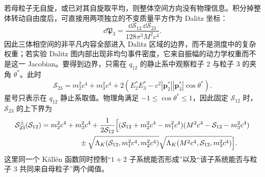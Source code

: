 若母粒子无自旋，或已对其自旋取平均，则整体空间方向没有物理信息。积分掉整体转动自由度后，可直接用两项独立的不变质量平方作为 Dalitz 坐标：
\begin{equation}
 \boxed{
 \dd\mathfrak P_3
 =\frac{\dd\mathcal S_{12}\,\dd\mathcal S_{23}}
 {128\pi^3 M^2c^4}.}
 \label{eq:phase3-dalitz-dp52}
\end{equation}
因此三体相空间的非平凡内容全部进入 Dalitz 区域的边界，而不是测度中的复杂权重；若实验 Dalitz 图内部出现非均匀事件密度，它来自振幅的动力学权重而不是这一 Jacobian。要得到边界，只需在 $q_{12}$ 的静止系中观察粒子 2 与粒子 3 的夹角 $\theta^*$。此时
\begin{equation}
 \boxed{
 \mathcal S_{23}
 =m_2^2c^4+m_3^2c^4
 +2\left(E_2^*E_3^*
 -c^2|\mathbf p_2^*||\mathbf p_3^*|\cos\theta^*\right).}
 \label{eq:dalitz-angular-map-dp68}
\end{equation}
星号只表示在 $q_{12}$ 静止系取值。物理角满足 $-1\le\cos\theta^*\le1$，因此固定 $\mathcal S_{12}$ 时，$\mathcal S_{23}$ 的上下界为
\begin{align}
 \mathcal S_{23}^{\pm}(\mathcal S_{12})
 ={}&m_2^2c^4+m_3^2c^4
 +\frac{1}{2\mathcal S_{12}}
 \Bigl[
 (\mathcal S_{12}+m_2^2c^4-m_1^2c^4)
 (M^2c^4-\mathcal S_{12}-m_3^2c^4)
 \nonumber\\
 &\qquad\qquad
 \pm
 \sqrt{\Lambda_K(\mathcal S_{12},m_1^2c^4,m_2^2c^4)}
 \sqrt{\Lambda_K(M^2c^4,\mathcal S_{12},m_3^2c^4)}
 \Bigr].
 \label{eq:dalitz-boundary-dp52}
\end{align}
这里同一个 K\"all\'en 函数同时控制“$1+2$ 子系统能否形成”以及“该子系统能否与粒子 3 共同来自母粒子”两个阈值。


